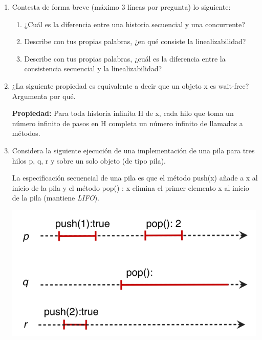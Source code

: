 \begin{enumerate}
    \item Contesta de forma breve (máximo 3 líneas por pregunta) lo siguiente:

    \begin{enumerate}
        \item ¿Cuál es la diferencia entre una historia secuencial y una concurrente?

        
        
        \item Describe con tus propias palabras, ¿en qué consiste la linealizabilidad?

        
        
        \item Describe con tus propias palabras, ¿cuál es la diferencia entre la consistencia secuencial y la linealizabilidad?

        
    \end{enumerate}

    \item ¿La siguiente propiedad es equivalente a decir que un objeto x es wait-free?
    Argumenta por qué.
    
    \textbf{Propiedad:} Para toda historia infinita H de x, cada hilo que toma un número infinito de pasos en H completa un número infinito de llamadas a métodos. 

    \item Considera la siguiente ejecución de una implementación de una pila para tres hilos p, q, r y sobre un solo objeto (de tipo pila).
    
    La especificación secuencial de una pila es que el método push(x) añade a x al inicio de la pila y el método pop() : x elimina el primer elemento x al inicio de la pila (mantiene \textit{LIFO}).

    \begin{center}
        \includegraphics[width = 12 cm]{Images/Pregunta3_3.png}
    \end{center}


\end{enumerate}
